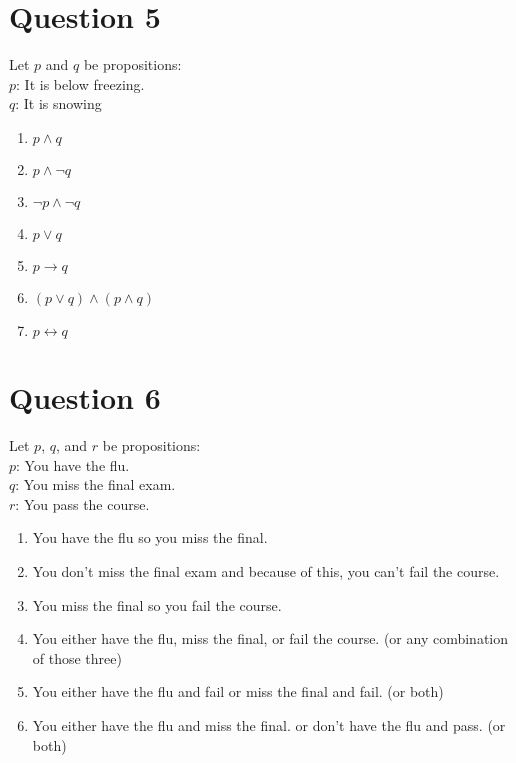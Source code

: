 \documentclass[12pt]{extarticle}
\begin{document}
\section*{Question 5}
	Let $p$ and $q$ be propositions:\\
		\hspace*{2cm}$p$: It is below freezing.\\
		\hspace*{2cm}$q$: It is snowing\\
	\begin{enumerate}
		\item $p \wedge q$
		\item $p \wedge \neg q$
		\item $\neg p \wedge \neg q$
		\item $p \vee q$
		\item $p \to q$
		\item $(p \vee q) \wedge (p \wedge q)$
		\item $p \leftrightarrow q$
	\end{enumerate}

\section*{Question 6}
	Let $p$, $q$, and $r$ be propositions:\\
		\hspace*{2cm}$p$: You have the flu.\\
		\hspace*{2cm}$q$: You miss the final exam.\\
		\hspace*{2cm}$r$: You pass the course.\\
	\begin{enumerate}
		\item You have the flu so you miss the final.
		\item You don't miss the final exam and because of this, you can't fail the course.
		\item You miss the final so you fail the course.
		\item You either have the flu, miss the final, or fail the course. (or any combination of those three)
		\item You either have the flu and fail or miss the final and fail. (or both) 
		\item You either have the flu and miss the final. or don't have the flu and pass. (or both)
	\end{enumerate}
	\clearpage
\end{document}
